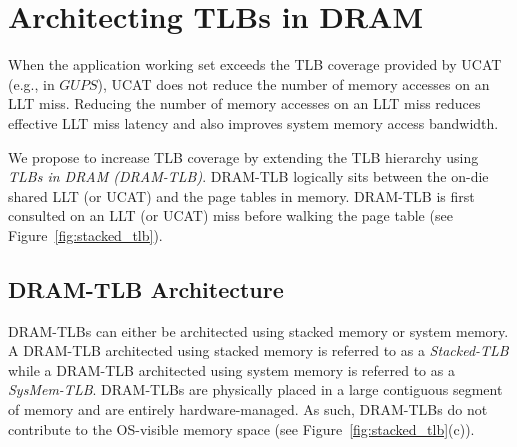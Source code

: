 \section{Architecting TLBs in DRAM } 
\label{sec:stackedTLB}

\noindent When the application working set exceeds the TLB coverage
provided by UCAT (e.g., in $GUPS$), UCAT does not reduce the number of
memory accesses on an LLT miss. Reducing the number of memory accesses
on an LLT miss reduces effective LLT miss latency and also improves 
system memory access bandwidth.

We propose to increase TLB coverage by extending the TLB hierarchy
using {\em TLBs in DRAM (DRAM-TLB)}. DRAM-TLB logically sits between
the on-die shared LLT (or UCAT) and the page tables in memory.
DRAM-TLB is first consulted on an LLT (or UCAT) miss before walking
the page table (see Figure~\ref{fig:stacked_tlb}).


\begin{figure*}[t] 
  \vspace{-0. in} \centering
   \centerline{}

  \caption{\small Improving TLB coverage by embedding TLBs in DRAM
    (DRAM-TLB). A DRAM-TLB architected using commodity DRAM is called
    SysMem-TLB and a DRAM-TLB architected with stacked DRAM is called
    Stacked-TLB. \normalsize}
  \label{fig:stacked_tlb} 
  \vspace{0.1 in}
\end{figure*}

\subsection{DRAM-TLB Architecture}

\noindent DRAM-TLBs can either be architected using stacked memory or
system memory. A DRAM-TLB architected using stacked memory is referred
to as a {\em Stacked-TLB} while a DRAM-TLB architected using system
memory is referred to as a {\em SysMem-TLB}. DRAM-TLBs are physically
placed in a large contiguous segment of memory and are entirely
hardware-managed. As such, DRAM-TLBs do not contribute to the
OS-visible memory space (see Figure~\ref{fig:stacked_tlb}(c)).

